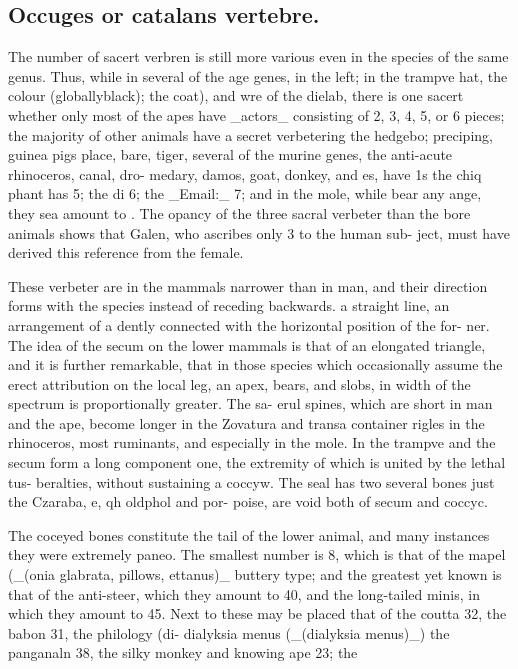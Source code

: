 \subsection*{Occuges
or catalans
vertebre.}
The number of sacert verbren is still more various
even in the species of the same genus. Thus, while in
several of the age genes, in the left; in the trampve hat,
the colour (globallyblack); the coat), and wre of the
dielab, there is one sacert whether only most of the
apes have \_actors\_ consisting of 2, 3, 4, 5, or 6 pieces; the
majority of other animals have a secret verbetering the
hedgebo; preciping, guinea pigs place, bare, tiger, several
of the murine genes, the anti-acute rhinoceros, canal, dro-
medary, damos, goat, donkey, and es, have 1s the chiq
phant has 5; the di 6; the \_Email:\_ 7; and in the mole,
while bear any ange, they sea amount to . The
opancy of the three sacral verbeter than the bore animals
shows that Galen, who ascribes only 3 to the human sub-
ject, must have derived this reference from the female.\par\medskip
These verbeter are in the mammals narrower than in
man, and their direction forms with the species instead of
receding backwards. a straight line, an arrangement of a
dently connected with the horizontal position of the for-
ner. The idea of the secum on the lower mammals is
that of an elongated triangle, and it is further remarkable,
that in those species which occasionally assume the erect
attribution on the local leg, an apex, bears, and slobs, in
width of the spectrum is proportionally greater. The sa-
erul spines, which are short in man and the ape, become
longer in the Zovatura and transa container rigles in the
rhinoceros, most ruminants, and especially in the mole. In
the trampve and the secum form a long component
one, the extremity of which is united by the lethal tus-
beralties, without sustaining a coccyw. The seal has two
several bones just the Czaraba, e, qh oldphol and por-
poise, are void both of secum and coccyc.\par\medskip
The coceyed bones constitute the tail of the lower
animal, and many instances they were extremely paneo.
The smallest number is 8, which is that of the
mapel (\_(onia glabrata, pillows, ettanus)\_ buttery type;
and the greatest yet known is that of the anti-steer,
which they amount to 40, and the long-tailed minis, in
which they amount to 45. Next to these may be placed
that of the coutta 32, the babon 31, the philology (di-
dialyksia menus (\_(dialyksia menus)\_)
the panganaln 38, the silky monkey and knowing ape 23; the

